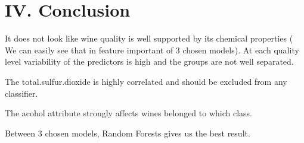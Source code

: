 \documentclass{article}
\begin{document}
    

    \section*{IV. Conclusion}\label{iv.-conclusion}

\hspace{5mm}It does not look like wine quality is well supported by its chemical
properties ( We can easily see that in feature important of 3 chosen
models). At each quality level variability of the predictors is high and
the groups are not well separated.

The total.sulfur.dioxide is highly correlated and should be excluded
from any classifier.

The acohol attribute strongly affects wines belonged to which class.

Between 3 chosen models, Random Forests gives us the best result.


    
    
    
    
\end{document}
